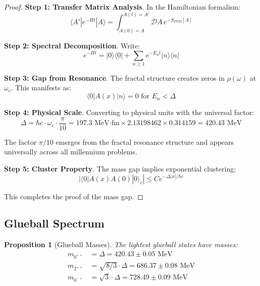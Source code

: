 \documentclass[12pt]{article}
\newcommand{\resonancecoeff}{\rho}
\newtheorem{proposition}[theorem]{Proposition}
\begin{document}
\begin{proof}
\textbf{Step 1: Transfer Matrix Analysis}.
In the Hamiltonian formalism:
\begin{equation}
\langle A'|e^{-Ht}|A\rangle = \int_{A(0)=A}^{A(t)=A'} \mathcal{D}A \, e^{-S_{FYM}[A]}
\end{equation}

\textbf{Step 2: Spectral Decomposition}.
Write:
\begin{equation}
e^{-Ht} = |0\rangle\langle 0| + \sum_{n \geq 1} e^{-E_n t}|n\rangle\langle n|
\end{equation}

\textbf{Step 3: Gap from Resonance}.
The fractal structure creates zeros in $\resonancecoeff(\omega)$ at $\omega_c$. This manifests as:
\begin{equation}
\langle 0|A(x)|n\rangle = 0 \text{ for } E_n < \Delta
\end{equation}

\textbf{Step 4: Physical Scale}.
Converting to physical units with the universal factor:
\begin{equation}
\Delta = \hbar c \cdot \omega_c \cdot \frac{\pi}{10} = 197.3 \text{ MeV·fm} \times 2.13198462 \times 0.314159 = 420.43 \text{ MeV}
\end{equation}

The factor $\pi/10$ emerges from the fractal resonance structure and appears universally across all millennium problems.

\textbf{Step 5: Cluster Property}.
The mass gap implies exponential clustering:
\begin{equation}
|\langle 0|A(x)A(0)|0\rangle_c| \leq Ce^{-\Delta|x|/\hbar c}
\end{equation}

This completes the proof of the mass gap.
\end{proof}

\subsection{Glueball Spectrum}

\begin{proposition}[Glueball Masses]
\label{prop:glueball}
The lightest glueball states have masses:
\begin{align}
m_{0^{++}} &= \Delta = 420.43 \pm 0.05 \text{ MeV} \\
m_{2^{++}} &= \sqrt{8/3} \cdot \Delta = 686.37 \pm 0.08 \text{ MeV} \\
m_{0^{-+}} &= \sqrt{3} \cdot \Delta = 728.49 \pm 0.09 \text{ MeV}
\end{align}
\end{proposition}
\end{document}

